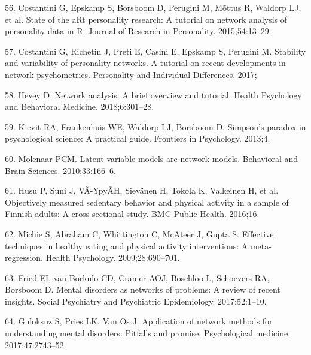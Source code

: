 \documentclass[english,man,floatsintext]{apa6}
\begin{document}
\leavevmode\hypertarget{ref-costantiniStateARtPersonality2015}{}%
56. Costantini G, Epskamp S, Borsboom D, Perugini M, Mõttus R, Waldorp LJ, et al. State of the aRt personality research: A tutorial on network analysis of personality data in R. Journal of Research in Personality. 2015;54:13--29.

\leavevmode\hypertarget{ref-costantiniStabilityVariabilityPersonality2017}{}%
57. Costantini G, Richetin J, Preti E, Casini E, Epskamp S, Perugini M. Stability and variability of personality networks. A tutorial on recent developments in network psychometrics. Personality and Individual Differences. 2017;

\leavevmode\hypertarget{ref-heveyNetworkAnalysisBrief2018}{}%
58. Hevey D. Network analysis: A brief overview and tutorial. Health Psychology and Behavioral Medicine. 2018;6:301--28.

\leavevmode\hypertarget{ref-kievitSimpsonParadoxPsychological2013}{}%
59. Kievit RA, Frankenhuis WE, Waldorp LJ, Borsboom D. Simpson's paradox in psychological science: A practical guide. Frontiers in Psychology. 2013;4.

\leavevmode\hypertarget{ref-molenaarLatentVariableModels2010}{}%
60. Molenaar PCM. Latent variable models are network models. Behavioral and Brain Sciences. 2010;33:166--6.

\leavevmode\hypertarget{ref-husuObjectivelyMeasuredSedentary2016a}{}%
61. Husu P, Suni J, VÃ\textcurrency-YpyÃ\textcurrency H, Sievänen H, Tokola K, Valkeinen H, et al. Objectively measured sedentary behavior and physical activity in a sample of Finnish adults: A cross-sectional study. BMC Public Health. 2016;16.

\leavevmode\hypertarget{ref-michieEffectiveTechniquesHealthy2009}{}%
62. Michie S, Abraham C, Whittington C, McAteer J, Gupta S. Effective techniques in healthy eating and physical activity interventions: A meta-regression. Health Psychology. 2009;28:690--701.

\leavevmode\hypertarget{ref-friedMentalDisordersNetworks2017a}{}%
63. Fried EI, van Borkulo CD, Cramer AOJ, Boschloo L, Schoevers RA, Borsboom D. Mental disorders as networks of problems: A review of recent insights. Social Psychiatry and Psychiatric Epidemiology. 2017;52:1--10.

\leavevmode\hypertarget{ref-guloksuzApplicationNetworkMethods2017}{}%
64. Guloksuz S, Pries LK, Van Os J. Application of network methods for understanding mental disorders: Pitfalls and promise. Psychological medicine. 2017;47:2743--52.
\end{document}
